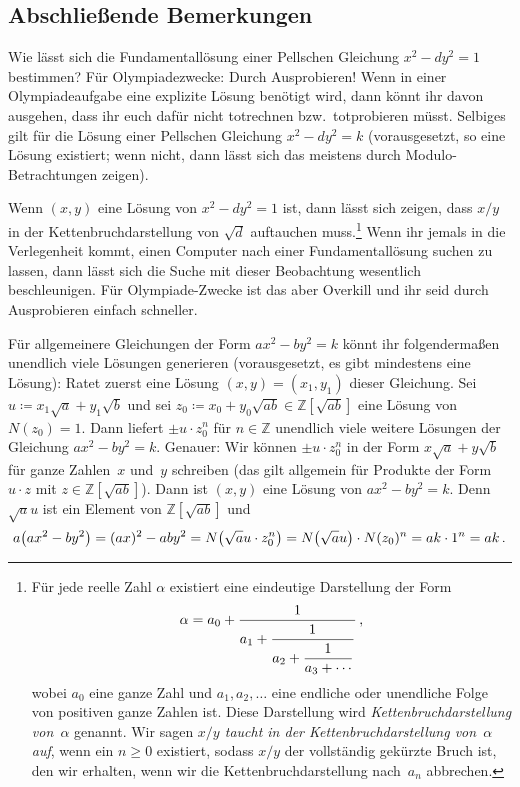 \subsection*{Abschließende Bemerkungen}
Wie lässt sich die Fundamentallösung einer Pellschen Gleichung $x^2-dy^2=1$ bestimmen? Für Olympiadezwecke: Durch Ausprobieren! Wenn in einer Olympiadeaufgabe eine explizite Lösung benötigt wird, dann könnt ihr davon ausgehen, dass ihr euch dafür nicht totrechnen bzw.\ totprobieren müsst. Selbiges gilt für die Lösung einer Pellschen Gleichung $x^2-dy^2=k$ (vorausgesetzt, so eine Lösung existiert; wenn nicht, dann lässt sich das meistens durch Modulo-Betrachtungen zeigen).

Wenn $(x,y)$ eine Lösung von $x^2-dy^2=1$ ist, dann lässt sich zeigen, dass $x/y$ in der Kettenbruchdarstellung von $\sqrt{d}$ auftauchen muss.\footnote{Für jede reelle Zahl $\alpha$ existiert eine eindeutige Darstellung der Form
	\begin{equation*}
		\alpha=a_0+\frac{1}{\displaystyle a_1+\frac{1^{\vphantom{t}}}{\displaystyle a_2+\frac{1^{\vphantom{t}}}{a_3+\dotsb}}}\,,
	\end{equation*}
	wobei $a_0$ eine ganze Zahl und $a_1,a_2,\dotsc$ eine endliche oder unendliche Folge von positiven ganze Zahlen ist. Diese Darstellung wird \emph{Kettenbruchdarstellung von~$\alpha$} genannt. Wir sagen \emph{$x/y$ taucht in der Kettenbruchdarstellung von~$\alpha$ auf}, wenn ein $n\geqslant 0$ existiert, sodass $x/y$ der vollständig gekürzte Bruch ist, den wir erhalten, wenn wir die Kettenbruchdarstellung nach~$a_n$ abbrechen.} Wenn ihr jemals in die Verlegenheit kommt, einen Computer nach einer Fundamentallösung suchen zu lassen, dann lässt sich die Suche mit dieser Beobachtung wesentlich beschleunigen. Für Olympiade-Zwecke ist das aber Overkill und ihr seid durch Ausprobieren einfach schneller.

Für allgemeinere Gleichungen der Form $ax^2-by^2=k$ könnt ihr folgendermaßen unendlich viele Lösungen generieren (vorausgesetzt, es gibt mindestens eine Lösung): Ratet zuerst eine Lösung $(x,y)=(x_1,y_1)$ dieser Gleichung. Sei $u\coloneqq x_1\sqrt{a}+y_1\sqrt{b}$ und sei $z_0\coloneqq x_0+y_0\sqrt{ab}\in\mathbb Z[\sqrt{ab}]$ eine Lösung von $N(z_0)=1$. Dann liefert $\pm u\cdot z_0^n$ für $n\in\mathbb Z$ unendlich viele weitere Lösungen der Gleichung $ax^2-by^2=k$. Genauer: Wir können $\pm u\cdot z_0^n$ in der Form $x\sqrt{a}+y\sqrt{b}$ für ganze Zahlen~$x$ und~$y$ schreiben (das gilt allgemein für Produkte der Form $u\cdot z$ mit $z\in\mathbb Z[\sqrt{ab}]$). Dann ist $(x,y)$ eine Lösung von $ax^2-by^2=k$. Denn $\sqrt{a} u$ ist ein Element von $\mathbb Z[\sqrt{ab}]$ und
\begin{equation*}
	a\parens*{ax^2-by^2}=(ax)^2-aby^2=N\parens*{\sqrt{a} u\cdot z_0^n}=N\parens*{\sqrt{a}u}\cdot N(z_0)^n=ak\cdot 1^n=ak\,.
\end{equation*}

